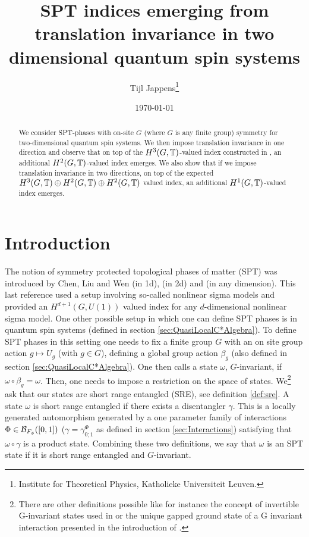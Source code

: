 \documentclass[12pt,a4paper,twoside]{article}
\title{SPT indices emerging from translation invariance in two dimensional quantum spin systems}
\author{Tijl Jappens\footnote{Institute for Theoretical Physics, Katholieke Universiteit Leuven.}}
\date{\today}
\numberwithin{equation}{section}
\begin{document}
\maketitle 
\begin{abstract}
	We consider SPT-phases with on-site $G$ (where $G$ is any finite group) symmetry for two-dimensional quantum spin systems. We then impose translation invariance in one direction and observe that on top of the $H^3(G,\mathbb T)$-valued index constructed in \cite{ogata2021h3gmathbb}, an additional $H^2(G,\mathbb T)$-valued index emerges. We also show that if we impose translation invariance in two directions, on top of the expected $H^3(G,\mathbb T)\oplus H^2(G,\mathbb T)\oplus H^2(G,\mathbb T)$ valued index, an additional $H^1(G,\mathbb T)$-valued index emerges.
\end{abstract}
\section{Introduction}
The notion of symmetry protected topological phases of matter (SPT) was introduced by Chen, Liu and Wen \cite{Chen_2011} (in 1d), \cite{chen_gu_wen_2011} (in 2d) and \cite{Chen_2013} (in any dimension). This last reference used a setup involving so-called nonlinear sigma models and provided an $H^{d+1}(G,U(1))$ valued index for any $d$-dimensional nonlinear sigma model. One other possible setup in which one can define SPT phases is in quantum spin systems (defined in section \ref{sec:QuasiLocalC*Algebra}). To define SPT phases in this setting one needs to fix a finite group $G$ with an on site group action $g\mapsto U_g$ (with $g\in G$), defining a global group action $\beta_g$ (also defined in section \ref{sec:QuasiLocalC*Algebra}). One then calls a state $\omega$, $G$-invariant, if $\omega\circ\beta_g=\omega$. Then, one needs to impose a restriction on the space of states. We\footnote{There are other definitions possible like for instance the concept of invertible G-invariant states used in \cite{kapustin2021classification} or the unique gapped ground state of a G invariant interaction presented in the introduction of \cite{ogata2021h3gmathbb}.} ask that our states are short range entangled (SRE), see definition \ref{def:sre}. A state $\omega$ is short range entangled if there exists a disentangler $\gamma$. This is a locally generated automorphism generated by a one parameter family of interactions $\Phi\in\mathcal B_{F_\phi}([0,1])$ ($\gamma=\gamma_{0;1}^\Phi$ as defined in section \ref{sec:Interactions}) satisfying that $\omega\circ\gamma$ is a product state. Combining these two definitions, we say that $\omega$ is an SPT state if it is short range entangled and $G$-invariant.
\end{document}
